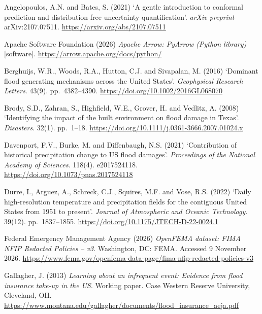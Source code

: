 \documentclass[10pt,twocolumn]{article}
\begin{document}
\begin{thebibliography}{}

Angelopoulos, A.N. and Bates, S. (2021)
`A gentle introduction to conformal prediction and distribution-free uncertainty quantification'.
\textit{arXiv preprint} arXiv:2107.07511. \url{https://arxiv.org/abs/2107.07511}

Apache Software Foundation (2026)
\textit{Apache Arrow: PyArrow (Python library)} [software]. \url{https://arrow.apache.org/docs/python/}

Berghuijs, W.R., Woods, R.A., Hutton, C.J. and Sivapalan, M. (2016)
`Dominant flood generating mechanisms across the United States'.
\textit{Geophysical Research Letters}. 43(9). pp.~4382--4390. \url{https://doi.org/10.1002/2016GL068070}

Brody, S.D., Zahran, S., Highfield, W.E., Grover, H. and Vedlitz, A. (2008)
`Identifying the impact of the built environment on flood damage in Texas'.
\textit{Disasters}. 32(1). pp.~1--18. \url{https://doi.org/10.1111/j.0361-3666.2007.01024.x}

Davenport, F.V., Burke, M. and Diffenbaugh, N.S. (2021)
`Contribution of historical precipitation change to US flood damages'.
\textit{Proceedings of the National Academy of Sciences}. 118(4). e2017524118. \url{https://doi.org/10.1073/pnas.2017524118}

Durre, I., Arguez, A., Schreck, C.J., Squires, M.F. and Vose, R.S. (2022)
`Daily high-resolution temperature and precipitation fields for the contiguous United States from
1951 to present'. \textit{Journal of Atmospheric and Oceanic Technology}. 39(12). pp.~1837--1855.
\url{https://doi.org/10.1175/JTECH-D-22-0024.1}

Federal Emergency Management Agency (2026)
\textit{OpenFEMA dataset: FIMA NFIP Redacted Policies -- v3}.
Washington, DC: FEMA. Accessed 9 November 2026.
\url{https://www.fema.gov/openfema-data-page/fima-nfip-redacted-policies-v3}

Gallagher, J. (2013)
\textit{Learning about an infrequent event: Evidence from flood insurance take-up in the US}.
Working paper. Case Western Reserve University, Cleveland, OH. \url{https://www.montana.edu/gallagher/documents/flood_insurance_aeja.pdf}


\end{thebibliography}
\end{document}
